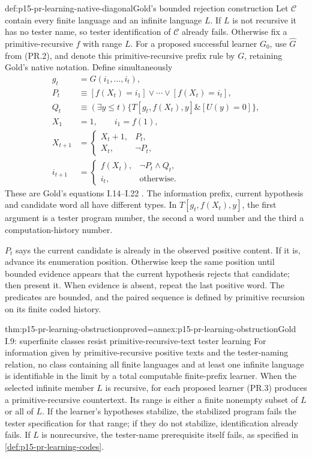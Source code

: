 \begin{hbmethod}{def:p15-pr-learning-native-diagonal}{Gold's bounded rejection construction}
Let \(\mathcal C\) contain every finite language and an infinite
language \(L\). If \(L\) is not recursive it has no tester name,
so tester identification of \(\mathcal C\) already fails.
Otherwise fix a primitive-recursive \(f\) with range \(L\).
For a proposed successful learner \(G_0\), use
\(\widehat G\) from (PR.2), and denote this primitive-recursive
prefix rule by \(G\), retaining Gold's native notation.
Define simultaneously
\[
 \begin{split}
 g_t&=G(i_1,\ldots,i_t),\\
 P_t&\equiv[f(X_t)=i_1]\lor\cdots\lor[f(X_t)=i_t],\\
 Q_t&\equiv(\exists y\leq t)
       \{T[g_t,f(X_t),y]\mathbin{\&}[U(y)=0]\},\\
 X_1&=1,\qquad i_1=f(1),\\
 X_{t+1}&=
 \begin{cases}X_t+1,&P_t,\\X_t,&\neg P_t,\end{cases}\\
 i_{t+1}&=
 \begin{cases}f(X_t),&\neg P_t\land Q_t,\\i_t,&\text{otherwise}.
 \end{cases}
 \end{split}
 \tag{PR.3}
\]
These are Gold's equations I.14--I.22
\cite[pp.\ 471--472]{Gold1967IdentificationFLT}.
The information prefix, current hypothesis and candidate word all
have different types. In \(T[g_t,f(X_t),y]\), the first argument
is a tester program number, the second a word number and the
third a computation-history number.

\(P_t\) says the current candidate is already in the observed
positive content. If it is, advance its enumeration position.
Otherwise keep the same position until bounded evidence appears
that the current hypothesis rejects that candidate; then present it.
When evidence is absent, repeat the last positive word.
The predicates are bounded, and the paired sequence is defined
by primitive recursion on its finite coded history.
\end{hbmethod}

\begin{hbtheorem}{thm:p15-pr-learning-obstruction}{proved=annex:p15-pr-learning-obstruction}{Gold I.9: superfinite classes resist primitive-recursive-text tester learning}
For information given by primitive-recursive positive texts and
the tester-naming relation, no class containing all finite languages
and at least one infinite language is identifiable in the limit
by a total computable finite-prefix learner.
When the selected infinite member \(L\) is recursive,
for each proposed learner (PR.3) produces a primitive-recursive
countertext. Its range is either a finite nonempty subset of \(L\)
or all of \(L\). If the learner's hypotheses stabilize, the
stabilized program fails the tester specification for that range;
if they do not stabilize, identification already fails.
If \(L\) is nonrecursive, the tester-name prerequisite itself fails,
as specified in \cref{def:p15-pr-learning-codes}.
\end{hbtheorem}

